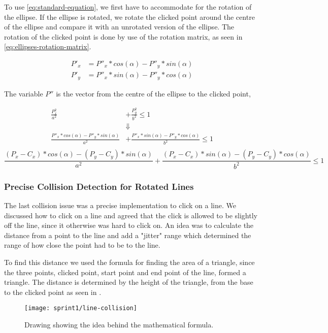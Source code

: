To use \eqref{eq:standard-equation}, we first have to accommodate for the rotation of the ellipse.
If the ellipse is rotated, we rotate the clicked point around the centre of the ellipse and compare it with an unrotated version of the ellipse.
The rotation of the clicked point is done by use of the rotation matrix, as seen in \eqref{eq:ellipses-rotation-matrix}.

\begin{equation}\label{eq:ellipses-rotation-matrix}
\begin{aligned}
	P'_x &= P''_x * cos(\alpha) - P''_y * sin(\alpha)\\
	P'_y &= P''_x * sin(\alpha) - P''_y * cos(\alpha)
\end{aligned}
\end{equation}

The variable $P''$ is the vector from the centre of the ellipse to the clicked point, 


\begin{equation}\label{eq:final-ellipses-equation}
\begin{aligned}
	\frac{P_x^2}{a^2} &+ \frac{P_y^2}{b^2} \leq 1	\\
	&\Downarrow\\
	\frac{ P''_x * cos(\alpha) - P''_y * sin(\alpha)}{a^2} &+ \frac{P''_x * sin(\alpha) - P''_y * cos(\alpha)}{b^2} \leq 1\\
\end{aligned}
\end{equation}
\begin{equation}		
	\frac{ (P_x - C_x) * cos(\alpha) - (P_y - C_y) * sin(\alpha)}{a^2} + \frac{(P_x - C_x) * sin(\alpha) - (P_y - C_y) * cos(\alpha)}{b^2} \leq 1
\end{equation}


\subsubsection{Precise Collision Detection for Rotated Lines}
The last collision issue was a precise implementation to click on a line.
We discussed how to click on a line and agreed that the click is allowed to be slightly off the line, since it otherwise was hard to click on.
An idea was to calculate the distance from a point to the line and add a "jitter" range which determined the range of how close the point had to be to the line.

To find this distance we used the formula for finding the area of a triangle, since the three points, clicked point, start point and end point of the line, formed a triangle.
The distance is determined by the height of the triangle, from the base to the clicked point as seen in .
\begin{figure}[h]
	\centering
	\texttt{[image: sprint1/line-collision]}
	\caption{Drawing showing the idea behind the mathematical formula.}
	\label{figure:line-collision}
\end{figure}

